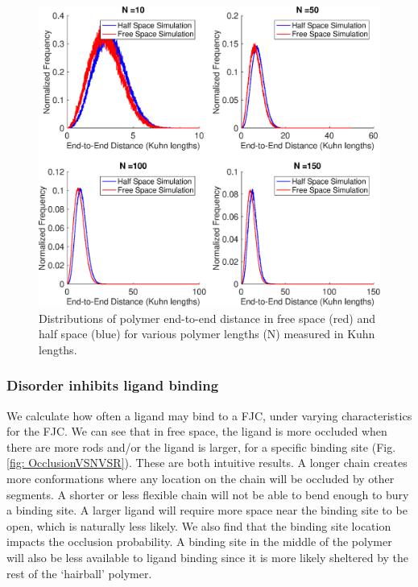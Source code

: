 \documentclass[../../AdvancementSummary.tex]{subfiles}
\begin{document}
\begin{figure}[H]
	\begin{center}
		\includegraphics[width=0.8\linewidth]{ResultsFigures/General/ReeDistributionHalfVSFreeSim.eps}
		\caption{Distributions of polymer end-to-end distance in free space (red) and half space (blue) for various polymer lengths (N) measured in Kuhn lengths. \label{fig: ReeHalfVSFree}}
	\end{center}
\end{figure}

\subsubsection{Disorder inhibits ligand binding}

We calculate how often a ligand may bind to a FJC, under varying characteristics for the FJC. We can see that in free space, the ligand is more occluded when there are more rods and/or the ligand is larger, for a specific binding site (Fig. \ref{fig: OcclusionVSNVSR}). These are both intuitive results. A longer chain creates more conformations where any location on the chain will be occluded by other segments. A shorter or less flexible chain will not be able to bend enough to bury a binding site. A larger ligand will require more space near the binding site to be open, which is naturally less likely.
We also find that the binding site location impacts the occlusion probability. A binding site in the middle of the polymer will also be less available to ligand binding since it is more likely sheltered by the rest of the `hairball' polymer. 
\end{document}
